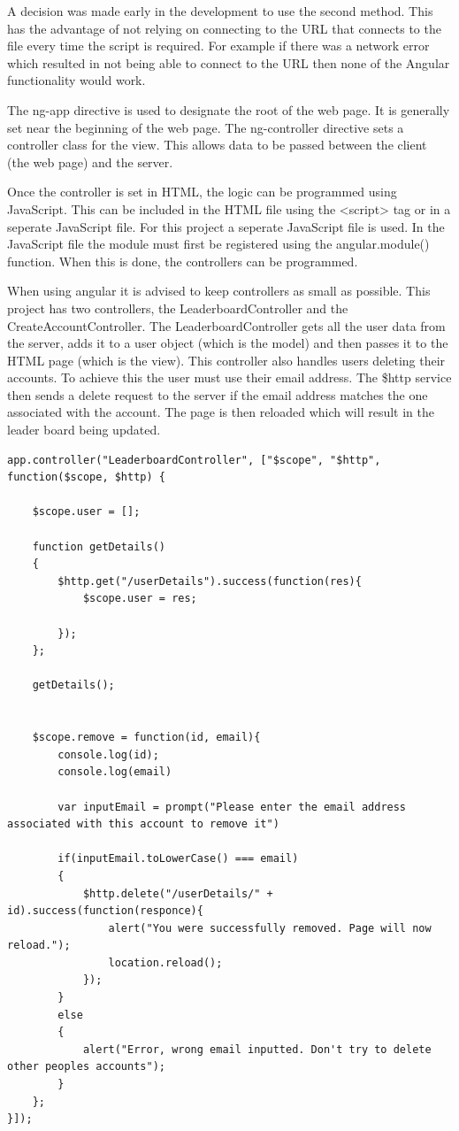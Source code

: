 \documentclass[12pt]{article}
\begin{document}
A decision was made early in the development to use the second method. This has the advantage of not relying on connecting to the URL that connects to the file every time the script is required. For example if there was a network error which resulted in not being able to connect to the URL then none of the Angular functionality would work.

The ng-app directive is used to designate the root of the web page. It is generally set near the beginning of the web page. The ng-controller directive sets a controller class for the view. This allows data to be passed between the client (the web page) and the server. 

Once the controller is set in HTML, the logic can be programmed using JavaScript. This can be included in the HTML file using the <script> tag or in a seperate JavaScript file. For this project a seperate JavaScript file is used. In the JavaScript file the module must first be registered using the angular.module() function. When this is done, the controllers can be programmed. 

When using angular it is advised to keep controllers as small as possible. This project has two controllers, the LeaderboardController and the CreateAccountController. The LeaderboardController gets all the user data from the server, adds it to a user object (which is the model) and then passes it to the HTML page (which is the view). This controller also handles users deleting their accounts. To achieve this the user must use their email address. The {\$}http service then sends a delete request to the server if the email address matches the one associated with the account. The page is then reloaded which will result in the leader board being updated.  

\begin{lstlisting}
app.controller("LeaderboardController", ["$scope", "$http", function($scope, $http) {

    $scope.user = [];

    function getDetails()
    {
        $http.get("/userDetails").success(function(res){
            $scope.user = res;

        });
    };

    getDetails();


    $scope.remove = function(id, email){
        console.log(id);
        console.log(email)

        var inputEmail = prompt("Please enter the email address associated with this account to remove it")

        if(inputEmail.toLowerCase() === email)
        {
            $http.delete("/userDetails/" + id).success(function(responce){
                alert("You were successfully removed. Page will now reload.");
                location.reload();
            });
        }
        else
        {
            alert("Error, wrong email inputted. Don't try to delete other peoples accounts");
        }
    };
}]);
\end{lstlisting}
\end{document}

